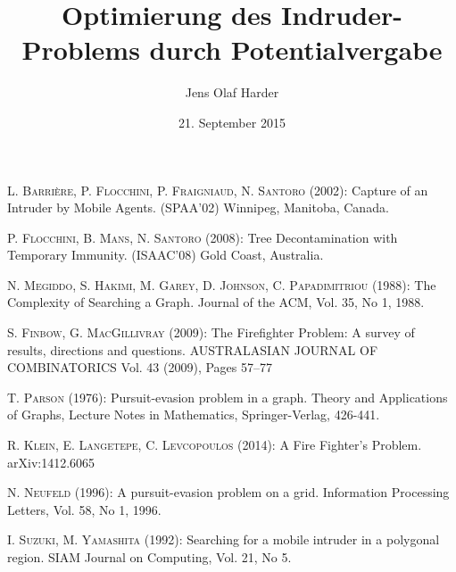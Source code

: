 \documentclass[12pt, a4paper, german]{article}
\author{Jens Olaf Harder}
\date{21. September 2015}
\title{Optimierung des Indruder-Problems durch Potentialvergabe}
\begin{document}
	\maketitle
	\newpage
	\pagestyle{empty}
	

	\pagestyle{plain}
	\tableofcontents
	
	\newpage
	
	
	
	
	

	
	
	
	
	
	
	\newpage

	\renewcommand{\refname}{Literaturquellen}
	
	\begin{thebibliography}{99}
		
		
		 \textsc{L. Barrière, P. Flocchini, P. Fraigniaud, N. Santoro} (2002): Capture of an Intruder by Mobile Agents. (SPAA'02) Winnipeg, Manitoba, Canada.

		 \textsc{P. Flocchini, B. Mans, N. Santoro} (2008): Tree Decontamination with Temporary Immunity. (ISAAC'08) Gold Coast, Australia.
		
		 \textsc{N. Megiddo, S. Hakimi, M. Garey, D. Johnson, C. Papadimitriou} (1988): The Complexity of Searching a Graph. Journal of the ACM, Vol. 35, No 1, 1988.
		
		 \textsc{S. Finbow, G. MacGillivray} (2009): The Firefighter Problem: A survey of results, directions and questions.
		AUSTRALASIAN JOURNAL OF COMBINATORICS Vol. 43 (2009), Pages 57–77
		
		 \textsc{T. Parson} (1976): Pursuit-evasion problem in a graph. Theory and Applications of Graphs, Lecture Notes in Mathematics, Springer-Verlag, 426-441.
		
		 \textsc{R. Klein, E. Langetepe, C.  Levcopoulos} (2014): A Fire Fighter's Problem. arXiv:1412.6065
		
		 \textsc{N. Neufeld} (1996): A pursuit-evasion problem on a grid. Information Processing Letters, Vol. 58, No 1, 1996.
		
		 \textsc{I. Suzuki, M. Yamashita} (1992): Searching for a mobile intruder in a polygonal region. SIAM Journal on Computing, Vol. 21, No 5.


		
	\end{thebibliography} 
	
	
\end{document}
